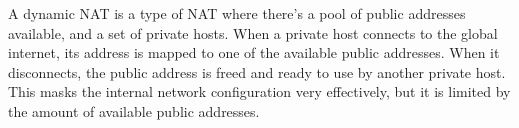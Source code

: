 A dynamic NAT is a type of NAT where there's a pool of public addresses available, and a set of private hosts. When a private host connects to the global internet, its address is mapped to one of the available public addresses. When it disconnects, the public address is freed and ready to use by another private host. This masks the internal network configuration very effectively, but it is limited by the amount of available public addresses.